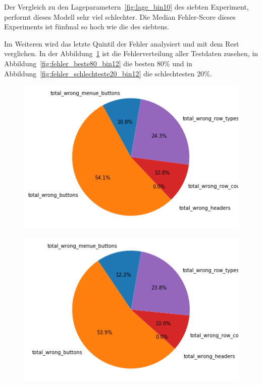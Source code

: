 \documentclass[pdftex,a4paper,halfparskip, article]{scrartcl}
\begin{document}
Der Vergleich zu den Lageparametern~\ref{fig:lage_bin10} des siebten Experiment, performt dieses Modell sehr viel schlechter. Die Median Fehler-Score dieses Experiments ist fünfmal so hoch wie die des siebtens.

Im Weiteren wird das letzte Quintil der Fehler analysiert und mit dem Rest verglichen. In der Abbildung~\ref{fig:fehler_gesamt_bin12} ist die Fehlerverteilung aller Testdaten zusehen, in Abbildung~\ref{fig:fehler_beste80_bin12} die besten 80\% und in Abbildung~\ref{fig:fehler_schlechteste20_bin12} die schlechtesten 20\%. 

\begin{figure}
\centering
\begin{minipage}{.33\textwidth}
  \centering
  \includegraphics[width=1\linewidth]{predictions_bin12_total_error_types_pie_chart}
  \label{fig:fehler_gesamt_bin12}
\end{minipage}%
\begin{minipage}{.33\textwidth}
  \centering
  \includegraphics[width=1\linewidth]{predictions_bin12_excluded_p80_error_types_pie_chart}

\end{minipage}
\end{figure}
\end{document}
